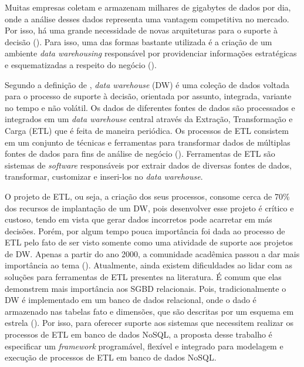 Muitas empresas coletam e armazenam milhares de gigabytes de dados por dia, onde a análise desses dados representa uma vantagem competitiva no mercado. Por isso, há uma grande necessidade de novas arquiteturas para o suporte à decisão (\cite{liu:2013}). Para isso, uma das formas bastante utilizada é a criação de um ambiente \textit{data warehousing} responsável por providenciar informações estratégicas e esquematizadas a respeito do negócio (\cite{dayal:1997}).

Segundo a definição de \cite{kimball:2002}, \textit{data warehouse} (DW) é uma coleção de dados voltada para o processo de suporte à decisão, orientada por assunto, integrada, variante no tempo e não volátil. Os dados de diferentes fontes de dados são processados e integrados em um \textit{data warehouse} central através da Extração, Transformação e Carga (ETL) que é feita de maneira periódica. Os processos de ETL consistem em um conjunto de técnicas e ferramentas para transformar dados de múltiplas fontes de dados para fins de análise de negócio (\cite{silva:2016}). Ferramentas de ETL são sistemas de \textit{software} responsáveis por extrair dados de diversas fontes de dados, transformar, customizar e inseri-los no \textit{data warehouse}.

O projeto de ETL, ou seja, a criação dos seus processos, consome cerca de 70\% dos recursos de implantação de um DW, pois desenvolver esse projeto é crítico e custoso, tendo em vista que gerar dados incorretos pode acarretar em más decisões. Porém, por algum tempo pouca importância foi dada ao processo de ETL pelo fato de ser visto somente como uma atividade de suporte aos projetos de DW. Apenas a partir do ano 2000, a comunidade acadêmica passou a dar mais importância ao tema (\cite{silva:2012}). Atualmente, ainda existem dificuldades ao lidar com as soluções para ferramentas de ETL presentes na literatura. É comum que elas demonstrem mais importância aos SGBD relacionais. Pois, tradicionalmente o DW é implementado em um banco de dados relacional, onde o dado é armazenado nas tabelas fato e dimensões, que são descritas por um esquema em estrela (\cite{kimball:2002}). Por isso, para oferecer suporte aos sistemas que necessitem realizar os processos de ETL em banco de dados NoSQL, a proposta desse trabalho é especificar um \textit{framework} programável, flexível e integrado para modelagem e execução de processos de ETL em banco de dados NoSQL.

%

